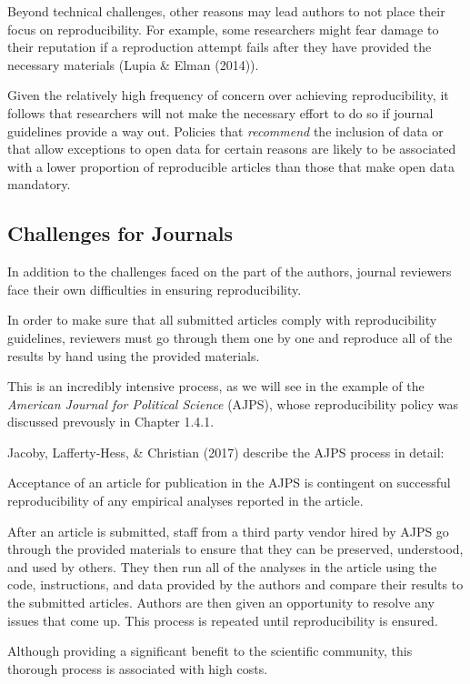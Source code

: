\documentclass[12pt,twoside]{reedthesis}
\begin{document}
Beyond technical challenges, other reasons may lead authors to not place their focus on reproducibility. For example, some researchers might fear damage to their reputation if a reproduction attempt fails after they have provided the necessary materials (Lupia \& Elman (2014)).

Given the relatively high frequency of concern over achieving reproducibility, it follows that researchers will not make the necessary effort to do so if journal guidelines provide a way out. Policies that \emph{recommend} the inclusion of data or that allow exceptions to open data for certain reasons are likely to be associated with a lower proportion of reproducible articles than those that make open data mandatory.

\hypertarget{challenges-for-journals}{%
\subsection{Challenges for Journals}\label{challenges-for-journals}}

In addition to the challenges faced on the part of the authors, journal reviewers face their own difficulties in ensuring reproducibility.

In order to make sure that all submitted articles comply with reproducibility guidelines, reviewers must go through them one by one and reproduce all of the results by hand using the provided materials.

This is an incredibly intensive process, as we will see in the example of the \emph{American Journal for Political Science} (AJPS), whose reproducibility policy was discussed prevously in Chapter 1.4.1.

Jacoby, Lafferty-Hess, \& Christian (2017) describe the AJPS process in detail:

Acceptance of an article for publication in the AJPS is contingent on successful reproducibility of any empirical analyses reported in the article.

After an article is submitted, staff from a third party vendor hired by AJPS go through the provided materials to ensure that they can be preserved, understood, and used by others. They then run all of the analyses in the article using the code, instructions, and data provided by the authors and compare their results to the submitted articles. Authors are then given an opportunity to resolve any issues that come up. This process is repeated until reproducibility is ensured.

Although providing a significant benefit to the scientific community, this thorough process is associated with high costs.
\end{document}
